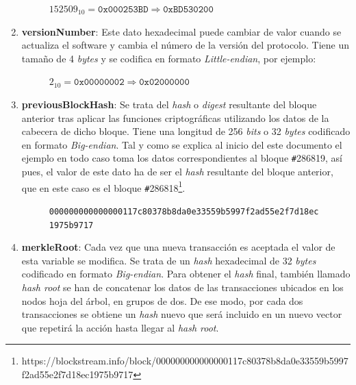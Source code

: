\documentclass{article}
\begin{document}
\begin{enumerate}
        \begin{figure}[H]
        \centering
            $152509_{10} = \texttt{0x000253BD} \Rightarrow \texttt{0xBD530200}$
        \end{figure}
        
        \item \textbf{versionNumber}: Este dato hexadecimal puede cambiar de valor cuando se actualiza el software y cambia el número de la versión del protocolo. Tiene un tamaño de 4 \textit{bytes} y se codifica en formato \textit{Little-endian}, por ejemplo:
        
        \begin{figure}[H]
        \centering
            $2_{10} = \texttt{0x00000002} \Rightarrow \texttt{0x02000000}$
        \end{figure}
        
        \item \textbf{previousBlockHash}: Se trata del \textit{hash} o \textit{digest} resultante del bloque anterior tras aplicar las funciones criptográficas utilizando los datos de la cabecera de dicho bloque. Tiene una longitud de 256 \textit{bits} o 32 \textit{bytes} codificado en formato \textit{Big-endian}. Tal y como se explica al inicio del este documento el ejemplo en todo caso toma los datos correspondientes al bloque \texttt{\#}286819, así pues, el valor de este dato ha de ser el \textit{hash} resultante del bloque anterior, que en este caso es el bloque \texttt{\#}286818\footnote{https://blockstream.info/block/000000000000000117c80378b8da0e33559b5997f2ad55e2f7d18ec1975b9717}.
        
        \begin{figure}[H]
        \centering
        \scriptsize{
            \texttt{000000000000000117c80378b8da0e33559b5997f2ad55e2f7d18ec1975b9717}
        }
        \end{figure}
        
        \item \textbf{merkleRoot}: Cada vez que una nueva transacción es aceptada el valor de esta variable se modifica. Se trata de un \textit{hash} hexadecimal de 32 \textit{bytes} codificado en formato \textit{Big-endian}. Para obtener el \textit{hash} final, también llamado \textit{hash root} se han de concatenar los datos de las transacciones ubicados en los nodos hoja del árbol, en grupos de dos. De ese modo, por cada dos transacciones se obtiene un \textit{hash} nuevo que será incluido en un nuevo vector que repetirá la acción hasta llegar al \textit{hash root}.
        

\end{enumerate}
\end{document}
